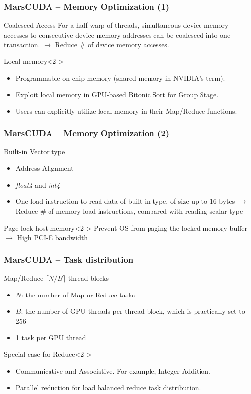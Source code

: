 \begin{frame}
\frametitle{MarsCUDA -- Memory Optimization (1)}
\begin{block}{Coalesced Access}
For a half-warp of threads, simultaneous device memory accesses to consecutive device memory addresses can be coalesced into one transaction. $\rightarrow$ Reduce \# of device memory accesses. 
\end{block}
\begin{block}{Local memory}<2->
\begin{itemize}
\item Programmable on-chip memory (shared memory in NVIDIA's term).
\item Exploit local memory in GPU-based Bitonic Sort for Group Stage. 
\item Users can explicitly utilize local memory in their Map/Reduce functions.
\end{itemize}
\end{block}
\end{frame}

\begin{frame}
\frametitle{MarsCUDA -- Memory Optimization (2)}
\begin{block}{Built-in Vector type}
\begin{itemize}
\item Address Alignment
\item {\em float4} and {\em int4}
\item One load instruction to read data of built-in type, of size up to 16 bytes $\rightarrow$ Reduce \# of memory load instructions, compared with reading scalar type
\end{itemize}
\end{block}
\begin{block}{Page-lock host memory}<2->
Prevent OS from paging the locked memory buffer $\rightarrow$ High PCI-E bandwidth
\end{block}
\end{frame}

\begin{frame}
\frametitle{MarsCUDA -- Task distribution}
\begin{block}{Map/Reduce}
$\lceil N/B \rceil$ thread blocks
\begin{itemize}
\item $N$: the number of Map or Reduce tasks
\item $B$: the number of GPU threads per thread block, which is practically set to 256
\item 1 task per GPU thread
\end{itemize}
\end{block}
\begin{block}{Special case for Reduce}<2->
\begin{itemize}
\item Communicative and Associative. For example, Integer Addition.
\item Parallel reduction for load balanced reduce task distribution.
\end{itemize}
\end{block}
\end{frame}



